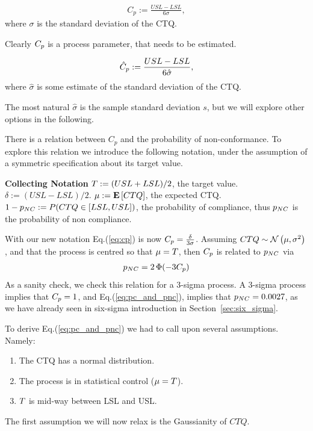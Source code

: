 \documentclass[12pt,a4paper]{report}
\begin{document}
\begin{definition}[$\cp$]
\begin{align}
\label{eq:cp}
	C_p:= \frac{USL-LSL}{6 \sigma}, 
\end{align}
where $\sigma$ is the standard deviation of the CTQ.

\end{definition}
Clearly $\cp$ is a process parameter, that needs to be estimated.
\begin{definition}[$\cpHat$]
\begin{align}
	\hat{C}_p:= \frac{USL-LSL}{6 \hat{\sigma}}, 
\end{align}
where $\hat{\sigma}$ is some estimate of the standard deviation of the CTQ.
\end{definition}
The most natural $\hat{\sigma}$ is the sample standard deviation $s$, but we will explore other options in the following.


There is a relation between $C_p$ and the probability of non-conformance. 
To explore this relation we introduce the following notation, under the assumption of a symmetric specification about its target value.
\begin{tcolorbox}
\footnotesize
\textbf{Collecting Notation} \newline
$T:= (USL+LSL)/2$, the target value. \newline
$\delta:= (USL-LSL)/2$.  \newline
$\mu:= \mathbf{E}\left[ CTQ \right]$, the expected CTQ. \newline
$1-p_{NC}:= P(CTQ \in [LSL,USL])$, the probability of compliance, thus $p_{NC}$ is the probability of non compliance. 
\end{tcolorbox}

With our new notation Eq.(\ref{eq:cp}) is now $C_p=\frac{\delta}{3 \sigma}$.
Assuming $CTQ \sim \mathcal{N}\left(\mu, \sigma^2\right)$, and that the process is centred so that $\mu=T$, then $\cp$ is related to $p_{NC}$ via
\begin{align}
\label{eq:pc_and_pnc}
 p_{NC}= 2\, \Phi(-3 C_p)
\end{align}
As a sanity check, we check this relation for a 3-sigma process.
A 3-sigma process implies that $C_p=1$, and Eq.(\ref{eq:pc_and_pnc}), implies that $p_{NC}=0.0027$, as we have already seen in six-sigma introduction in Section~\ref{sec:six_sigma}.

To derive Eq.(\ref{eq:pc_and_pnc}) we had to call upon several assumptions.
Namely:
\begin{enumerate}
\item The CTQ has a normal distribution.
\item The process is in statistical control ($\mu=T$).
\item $T$ is mid-way between LSL and USL.
\end{enumerate}
The first assumption we will now relax is the Gaussianity of $CTQ$. 
\end{document}
